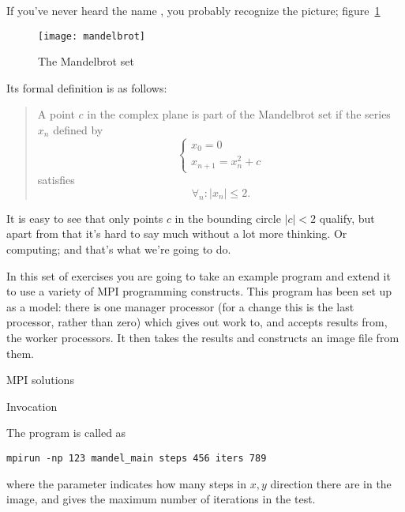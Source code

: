
If you've never heard the name , you
probably recognize the picture; figure~\ref{fig:mandelbrotset}
%
\begin{figure}[ht]
\texttt{[image: mandelbrot]}
\label{fig:mandelbrotset}
\caption{The Mandelbrot set}
\end{figure}
%
Its formal definition is as follows:
\begin{quotation}\noindent
  A point $c$ in the complex plane is part of the Mandelbrot set if 
  the series $x_n$ defined by 
  \[ 
  \begin{cases}
    x_0=0\\ x_{n+1}=x_n^2+c
  \end{cases}
  \] satisfies \[ \forall_n\colon |x_n|\leq 2. \]  
\end{quotation}
It is easy to see that only points $c$ in the bounding circle
$|c|< 2$ qualify, but
apart from that it's hard to say much without a lot more thinking.
Or computing; and that's what we're going to do.

In this set of exercises you are going to take an example program
 and extend it to use a variety of MPI programming
constructs.  This program has been set up as a
 model: there is one manager processor (for a
change this is the last processor, rather than zero) which gives out
work to, and accepts results from, the worker processors. It then
takes the results and constructs an image file from them.

 {MPI solutions}

 {Invocation}

The  program is called as
\begin{verbatim}
mpirun -np 123 mandel_main steps 456 iters 789
\end{verbatim}
where the  parameter indicates how many steps in $x,y$
direction there are in the image, and  gives the maximum
number of iterations in the  test.

